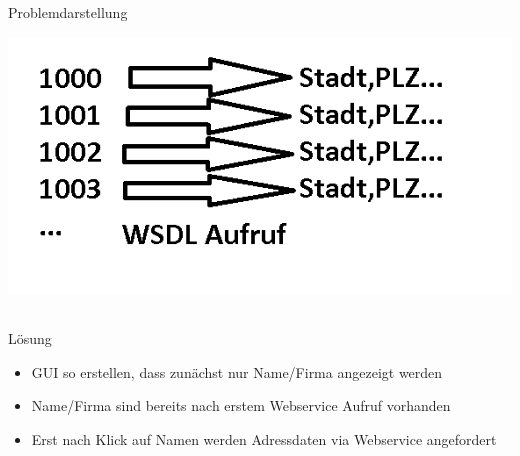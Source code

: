 \documentclass[xcolor={usenames,dvipsnames}, compress, 10pt]{beamer}
\begin{document}
\subsection*{}

\begin{frame}{Problemdarstellung}
\begin{center}

\includegraphics[width=\textheight]{Bilder/presi1.png} 

\end{center}
\end{frame}

\subsection*{}

\begin{frame}{Lösung}
\begin{center}

\begin{itemize}
\item GUI so erstellen, dass zunächst nur Name/Firma angezeigt werden
\item Name/Firma sind bereits nach erstem Webservice Aufruf vorhanden
\item Erst nach Klick auf Namen werden Adressdaten via Webservice angefordert
\end{itemize}

\end{center}
\end{frame}

\subsection*{}
\end{document}
